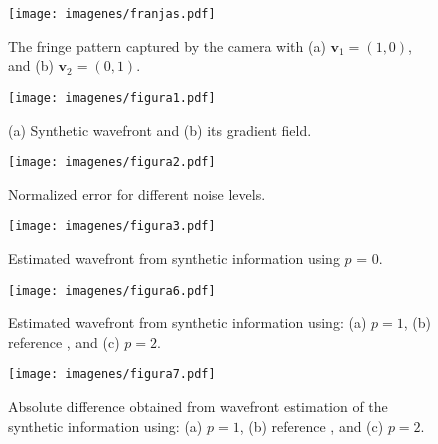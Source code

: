 \documentclass[12pt,letterpaper]{article}
\begin{document}
\newpage
\begin{figure}[ht]
  \begin{center}
   \texttt{[image: imagenes/franjas.pdf]}
    \caption{The fringe pattern captured by the camera with (a) $\mathbf{v}_{1} = (1,0)$, and (b) $\mathbf{v}_{2} = (0,1)$.}\label{fig:Franjas}
  \end{center}
\end{figure}

\begin{figure}[ht]
  \begin{center}
   \texttt{[image: imagenes/figura1.pdf]}
    \caption{(a) Synthetic wavefront and (b) its gradient field.}\label{fig:SinteticoOriginal}
  \end{center}
\end{figure}

\begin{figure}[ht]
  \begin{center}
   \texttt{[image: imagenes/figura2.pdf]}
    \caption{Normalized error for different noise levels.}\label{fig:Error}
  \end{center}
\end{figure}

\begin{figure}[ht]
  \begin{center}
   \texttt{[image: imagenes/figura3.pdf]}
    \caption{Estimated wavefront from synthetic information using $p$ = 0.}\label{fig:SinteticoEstimado}
  \end{center}
\end{figure}

\begin{figure}[ht]
	\begin{center}
		\texttt{[image: imagenes/figura6.pdf]}
		\caption{Estimated wavefront from synthetic information using: (a) $p = 1$,  (b) reference , and (c) $p = 2$.}\label{fig:SinteticoEstimado1}
	\end{center}
\end{figure}


\begin{figure}[ht]
	\begin{center}
		\texttt{[image: imagenes/figura7.pdf]}
		\caption{Absolute difference obtained from wavefront estimation of the synthetic information using: (a) $p = 1$,  (b) reference , and (c) $p = 2$.}\label{fig:SinteticoEstimado2}
	\end{center}
\end{figure}
\end{document}
